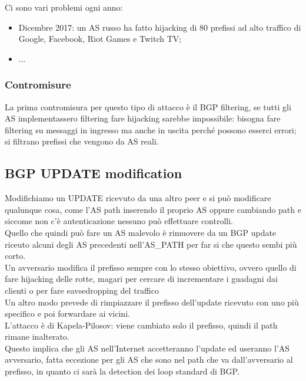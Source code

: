 \documentclass[12pt, oneside]{extbook} %
\begin{document}
Ci sono vari problemi ogni anno:
\begin{itemize}
    \item Dicembre 2017: un AS russo ha fatto hijacking di 80 prefissi ad alto traffico di Google, Facebook, Riot Games e Twitch TV;
    \item ...
\end{itemize}
\subsubsection{Contromisure}
La prima contromisura per questo tipo di attacco è il BGP filtering, se tutti gli AS implementassero filtering fare hijacking sarebbe impossibile: bisogna fare filtering su messaggi in ingresso ma anche in uscita perché possono esserci errori; si filtrano prefissi che vengono da AS reali.

\subsection{BGP UPDATE modification}
Modifichiamo un UPDATE ricevuto da una altro peer e si può modificare qualunque cosa, come l'AS path inserendo il proprio AS oppure cambiando path e siccome non c'è autenticazione nessuno può effettuare controlli.
\\Quello che quindi può fare un AS malevolo è rimuovere da un BGP update riceuto alcuni degli AS precedenti nell'AS\_PATH per far si che questo sembi più corto.
\\Un avversario modifica il prefisso sempre con lo stesso obiettivo, ovvero quello di fare hijacking delle rotte, magari per cercare di incrementare i guadagni dai clienti o per fare eavsedropping del traffico
\\Un altro modo prevede di rimpiazzare il prefisso dell'update ricevuto con uno più specifico e poi forwardare ai vicini.
\\L'attacco è di Kapela-Pilosov: viene cambiato solo il prefisso, quindi il path rimane inalterato.
\\Questo implica che gli AS nell'Internet accetteranno l'update ed useranno l'AS avversario, fatta eccezione per gli AS che sono nel path che va dall'avversario al prefisso, in quanto ci sarà la detection dei loop standard di BGP.
\end{document}
